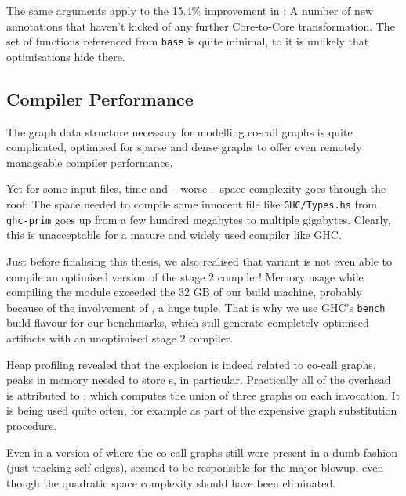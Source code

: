 The same arguments apply to the 15.4\% improvement in :
A number of new annotations that haven't kicked of any further Core-to-Core transformation.
The set of functions referenced from \texttt{base} is quite minimal, to it is unlikely that optimisations hide there.

\subsection{Compiler Performance}\label{sec:compperf}

The graph data structure necessary for modelling co-call graphs is quite complicated, optimised for sparse and dense graphs to offer even remotely manageable compiler performance.

Yet for some input files, time and -- worse -- space complexity goes through the roof:
The space needed to compile some innocent file like \texttt{GHC/Types.hs} from \texttt{ghc-prim} goes up from a few hundred megabytes to multiple gigabytes.
Clearly, this is unacceptable for a mature and widely used compiler like GHC.

Just before finalising this thesis, we also realised that variant \varfull is not even able to compile an optimised version of the stage 2 compiler!
Memory usage while compiling the  module exceeded the 32 GB of our build machine, probably because of the involvement of , a huge tuple.
That is why we use GHC's \texttt{bench} build flavour for our benchmarks, which still generate completely optimised artifacts with an unoptimised stage 2 compiler.

Heap profiling revealed that the explosion is indeed related to co-call graphs, peaks in memory needed to store s, in particular.
Practically all of the overhead is attributed to , which computes the union of three graphs on each invocation. 
It is being used quite often, for example as part of the expensive graph substitution procedure.

Even in a version of \varedges where the co-call graphs still were present in a dumb fashion (\eg just tracking self-edges),  seemed to be responsible for the major blowup, even though the quadratic space complexity should have been eliminated.

